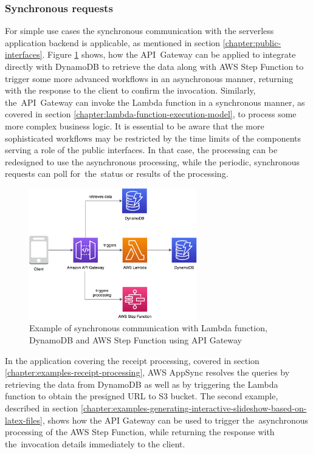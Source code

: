 \subsubsection{Synchronous requests} \label{chapter:client-synchronous-requests}

For simple use cases the synchronous communication with the serverless application backend is applicable, as mentioned in section \ref{chapter:public-interfaces}.
Figure \ref{fig:pattern-synchronous-request} shows, how the API~Gateway can be applied to integrate directly with DynamoDB to retrieve the data along with AWS Step Function to trigger some more advanced workflows in an asynchronous manner, returning with the response to the client to confirm the invocation.
Similarly, the~API~Gateway can invoke the Lambda function in a synchronous manner, as covered in section \ref{chapter:lambda-function-execution-model}, to process some more complex business logic.
It is essential to be aware that the more sophisticated workflows may be restricted by the time limits of the components serving a role of the public interfaces.
In that case, the processing can be redesigned to use the asynchronous processing, while the periodic, synchronous requests can poll for~the~status or results of the processing.

\begin{figure}[h]
   \centering
   \includegraphics[width=0.65\textwidth]{assets/04-serverless-for-web-apps/synchronousRequest.png}
   \caption{Example of synchronous communication with Lambda function, DynamoDB and AWS Step Function using API Gateway}
   \label{fig:pattern-synchronous-request}
\end{figure}

In the application covering the receipt processing, covered in section \ref{chapter:examples-receipt-processing}, AWS AppSync resolves the queries by retrieving the data from DynamoDB as well as by triggering the Lambda function to obtain the presigned URL to S3 bucket.
The second example, described in section \ref{chapter:examples-generating-interactive-slideshow-based-on-latex-files}, shows how the API Gateway can be used to trigger the~asynchronous processing of the AWS Step Function, while returning the response with the~invocation details immediately to the client.

